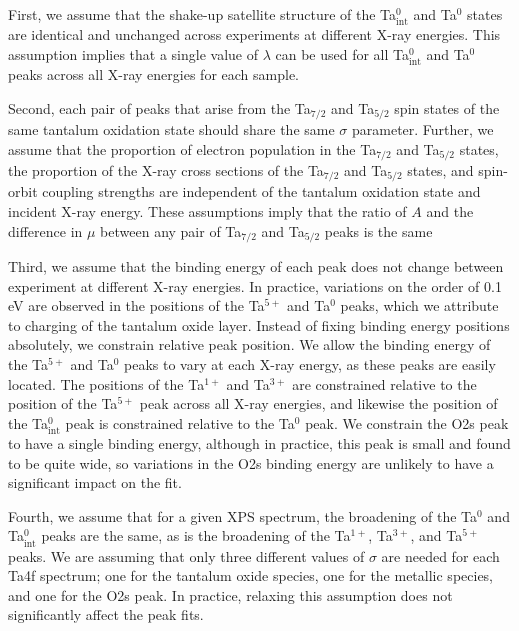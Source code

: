 \documentclass{WileyMSP-template}
\begin{document}
First, we assume that the shake-up satellite structure of the Ta$^{0}_\text{int}$ and Ta$^{0}$ states are identical and unchanged across experiments at different X-ray energies. This assumption implies that a single value of $\lambda$ can be used for all Ta$^{0}_\text{int}$ and Ta$^{0}$ peaks across all X-ray energies for each sample.

Second, each pair of peaks that arise from the Ta$_{7/2}$ and Ta$_{5/2}$ spin states of the same tantalum oxidation state should share the same $\sigma$ parameter. Further, we assume that the proportion of electron population in the Ta$_{7/2}$ and Ta$_{5/2}$ states, the proportion of the X-ray cross sections of the Ta$_{7/2}$ and Ta$_{5/2}$ states, and spin-orbit coupling strengths are independent of the tantalum oxidation state and incident X-ray energy. These assumptions imply that the ratio of $A$ and the difference in $\mu$ between any pair of Ta$_{7/2}$ and Ta$_{5/2}$ peaks is the same

Third, we assume that the binding energy of each peak does not change between experiment at different X-ray energies. In practice, variations on the order of 0.1 eV are observed in the positions of the Ta$^{5+}$ and Ta$^{0}$ peaks, which we attribute to charging of the tantalum oxide layer. Instead of fixing binding energy positions absolutely, we constrain relative peak position. We allow the binding energy of the Ta$^{5+}$ and Ta$^{0}$ peaks to vary at each X-ray energy, as these peaks are easily located. The positions of the Ta$^{1+}$ and Ta$^{3+}$ are constrained relative to the position of the Ta$^{5+}$ peak across all X-ray energies, and likewise the position of the Ta$^{0}_\text{int}$ peak is constrained relative to the Ta$^{0}$ peak. We constrain the O2s peak to have a single binding energy, although in practice, this peak is small and found to be quite wide, so variations in the O2s binding energy are unlikely to have a significant impact on the fit.

Fourth, we assume that for a given XPS spectrum, the broadening of the Ta$^0$ and Ta$^0_\text{int}$ peaks are the same, as is the broadening of the Ta$^{1+}$, Ta$^{3+}$, and Ta$^{5+}$ peaks. We are assuming that only three different values of $\sigma$ are needed for each Ta4f spectrum; one for the tantalum oxide species, one for the metallic species, and one for the O2s peak. In practice, relaxing this assumption does not significantly affect the peak fits.
\end{document}
